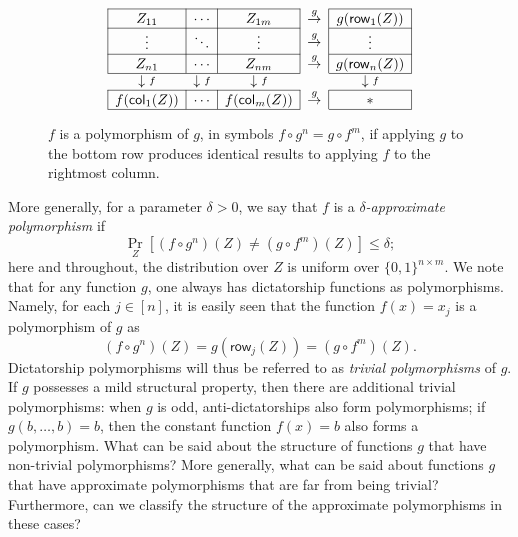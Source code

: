\documentclass{article}
\theoremstyle{definition}
\theoremstyle{remark}
\providecommand{\row}{\mathsf{row}}
\providecommand{\col}{\mathsf{col}}
\providecommand{\skipi}{\vspace{10pt}}
\renewcommand\leq{\leqslant}
\begin{document}
\begin{figure}[!ht]
\[
\begin{array}{|c|c|c|c|c|}
\cline{1-3} \cline{5-5}
Z_{11} & \cdots & Z_{1m} & \stackrel g\to & g(\row_1(Z))
\\ \cline{1-3} \cline{5-5}
\vdots & \ddots & \vdots & \raisebox{2pt}{$\stackrel g\to$} & \vdots 
\\ \cline{1-3} \cline{5-5}
Z_{n1} & \cdots & Z_{nm} & \stackrel g\to & g(\row_n(Z))
\\ \cline{1-3} \cline{5-5}
\multicolumn{1}{c}{\downarrow \raisebox{1pt}{$\scriptstyle f$}} &
\multicolumn{1}{c}{\downarrow \raisebox{1pt}{$\scriptstyle f$}} &
\multicolumn{1}{c}{\downarrow \raisebox{1pt}{$\scriptstyle f$}} &
\multicolumn{1}{c}{} &
\multicolumn{1}{c}{\downarrow \raisebox{1pt}{$\scriptstyle f$}}
\\ \cline{1-3} \cline{5-5}
f(\col_1(Z)) & \cdots & f(\col_m(Z)) & \stackrel g\to & \ast
\\ \cline{1-3} \cline{5-5}
\end{array}
\]
    \caption{$f$ is a polymorphism of $g$, in symbols $f \circ g^n = g \circ f^m$, if applying $g$ to the bottom row produces identical results to applying $f$ to the rightmost column.}
    \label{fig:polymorphism}
\end{figure}

More generally, for a parameter $\delta>0$, we say that $f$ is a \emph{$\delta$-approximate 
polymorphism} if 
\[
\Pr_{Z}[(f \circ g^{n})(Z) \neq (g \circ f^{m})(Z)]\leq \delta;
\]
here and throughout, the distribution over $Z$ is uniform over $\{0,1\}^{n\times m}$. We note that for any function $g$, one always has dictatorship functions as polymorphisms. Namely, for each $j\in[n]$, it is
easily seen that the function $f(x) = x_j$ is a polymorphism of $g$ as 
\[
(f \circ g^{n})(Z)
=g(\row_j(Z))
=(g\circ f^{m})(Z).
\]
Dictatorship polymorphisms will thus be referred to as \emph{trivial polymorphisms} of $g$. If $g$ possesses a mild structural property, then there are additional 
trivial polymorphisms: when $g$ is odd, anti-dictatorships also form 
polymorphisms; if $g(b,\ldots,b) = b$, then the constant function $f(x) = b$ also forms a polymorphism.
What can be said about the structure of functions $g$ that have non-trivial polymorphisms? More generally, what can be said about functions $g$ that have approximate polymorphisms that are far from being trivial? Furthermore, can we classify the structure of the approximate polymorphisms in these cases?
\end{document}
